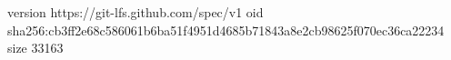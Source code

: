 version https://git-lfs.github.com/spec/v1
oid sha256:cb3ff2e68c586061b6ba51f4951d4685b71843a8e2cb98625f070ec36ca22234
size 33163
